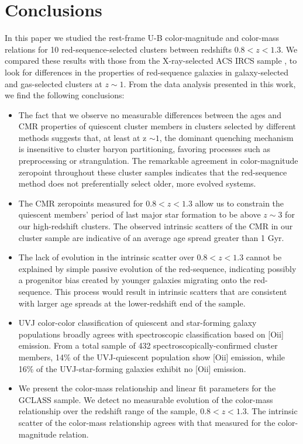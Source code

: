 \section{Conclusions}\label{conclusions}

In this paper we studied the rest-frame U-B color-magnitude and color-mass relations for 10 red-sequence-selected clusters between redshifts $0.8 < z < 1.3$.
We compared these results with those from the X-ray-selected ACS IRCS sample \citep{Mei:2009wt}, to look for differences in the properties of red-sequence galaxies in galaxy-selected and gas-selected clusters at $z \sim 1$.
From the data analysis presented in this work, we find the following conclusions:

\begin{itemize}

\item
The fact that we observe no measurable differences between the ages and CMR properties of quiescent cluster members in clusters selected by different methods suggests that, at least at z $\sim 1$, the dominant quenching mechanism is insensitive to cluster baryon partitioning, favoring processes such as preprocessing or strangulation.
The remarkable agreement in color-magnitude zeropoint throughout these cluster samples indicates that the red-sequence method does not preferentially select older, more evolved systems.

\item
The CMR zeropoints measured for $0.8 < z < 1.3$ allow us to constrain the quiescent members' period of last major star formation to be above $z \sim 3$ for our high-redshift clusters. The observed intrinsic scatters of the CMR in our cluster sample are indicative of an average age spread greater than 1 Gyr.

\item The lack of evolution in the intrinsic scatter over $0.8 < z < 1.3$ cannot be explained by simple passive evolution of the red-sequence, indicating possibly a progenitor bias created by younger galaxies migrating onto the red-sequence. This process would result in intrinsic scatters that are consistent with larger age spreads at the lower-redshift end of the sample.

\item UVJ color-color classification of quiescent and star-forming galaxy populations broadly agrees with spectroscopic classification based on [O{\sc ii}] emission. From a total sample of 432 spectroscopically-confirmed cluster members, 14\% of the UVJ-quiescent population show [O{\sc ii}] emission, while 16\% of the UVJ-star-forming galaxies exhibit no [O{\sc ii}] emission.

\item We present the color-mass relationship and linear fit parameters for the GCLASS sample. We detect no measurable evolution of the color-mass relationship over the redshift range of the sample, $0.8 < z < 1.3$. The intrinsic scatter of the color-mass relationship agrees with that measured for the color-magnitude relation.

\end{itemize}

